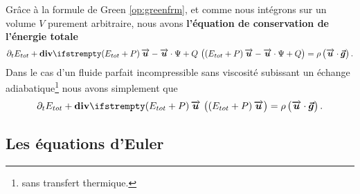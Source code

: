 \begin{refe}
Grâce à la formule de Green \eqref{op:greenfrm}, et comme nous intégrons sur un volume $V$ purement arbitraire, nous avons \textbf{l'équation de conservation de l'énergie totale}
\begin{equation}
	\partial_t E_{tot} + \div[\left(E_{tot} + P\right)\velocity - \velocity\cdot\Psi + Q] = \rho \left(\velocity\cdot \gvec\right).\label{eq:consenergy}
\end{equation}
Dans le cas d'un fluide parfait incompressible sans viscosité subissant un échange adiabatique\footnote{sans transfert thermique.} nous avons simplement que
\begin{equation}
	\partial_t E_{tot} + \div[\left(E_{tot} + P\right)\velocity] = \rho \left(\velocity\cdot \gvec\right).\label{eq:consenergyI}
\end{equation}
\end{refe}

\subsection{Les équations d'Euler}

